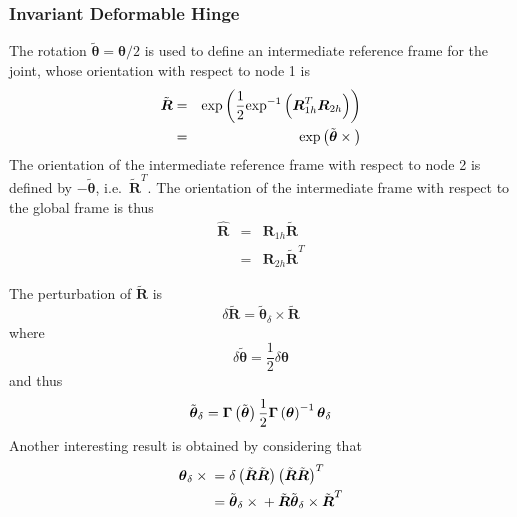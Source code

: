 \documentclass[10pt,dvips,fleqn]{report}
\newcommand{\T}[1]{\boldsymbol{#1}}
\begin{document}
\subsubsection{Invariant Deformable Hinge}
The rotation $\tilde{\T{\theta}}=\T{\theta}/2$
is used to define an intermediate reference frame for the joint,
whose orientation with respect to node 1 is
\begin{eqnarray}
	\tilde{\T{R}} & = & \llk{exp}\plbr{\frac{1}{2}\llk{exp}^{-1}\plbr{\T{R}_{1h}^T \T{R}_{2h}}} \\
		& = & \llk{exp}\plbr{\tilde{\T{\theta}}\times{}}
\end{eqnarray}
The orientation of the intermediate reference frame with respect 
to node 2 is defined by $-\tilde{\T{\theta}}$, i.e.\ $\tilde{\T{R}}^T$.
The orientation of the intermediate frame with respect
to the global frame is thus
\begin{eqnarray}
	\hat{\T{R}} & = & \T{R}_{1h} \tilde{\T{R}} \\
	& = & \T{R}_{2h} \tilde{\T{R}}^T
\end{eqnarray}
\begin{comment}
The derivative of $\tilde{\T{R}}$ is
\begin{equation}
	\dot{\tilde{\T{R}}} = \frac{1}{2}\plbr{\T{\omega}_2 - \T{\omega}_1}\times\tilde{\T{R}}
\end{equation}
and the derivative of $\hat{\T{R}}$ is
\begin{equation}
	\dot{\hat{\T{R}}} = \frac{1}{2}\plbr{\T{\omega}_1 + \T{\omega}_2}\times\hat{\T{R}}
\end{equation}
\end{comment}
The perturbation of $\tilde{\T{R}}$ is
\begin{equation}
	\delta\tilde{\T{R}} = \tilde{\T{\theta}}_{\delta}\times\tilde{\T{R}}
\end{equation}
where
\begin{equation}
	\delta\tilde{\T{\theta}} = \frac{1}{2} \delta \T{\theta}
\end{equation}
and thus
\begin{equation}
	\tilde{\T{\theta}}_{\delta} = \T{\Gamma}\plbr{\tilde{\T{\theta}}} \frac{1}{2} \T{\Gamma}\plbr{\T{\theta}}^{-1} \T{\theta}_{\delta} 
\end{equation}
Another interesting result is obtained by considering that
\begin{align}
	\T{\theta}_{\delta} \times{}
	&= \delta\plbr{\tilde{\T{R}}\tilde{\T{R}}} \plbr{\tilde{\T{R}}\tilde{\T{R}}}^T \\
	&= \tilde{\T{\theta}}_{\delta} \times{} + \tilde{\T{R}} \tilde{\T{\theta}}_{\delta} \times \tilde{\T{R}}^T
\end{align}
\end{document}
